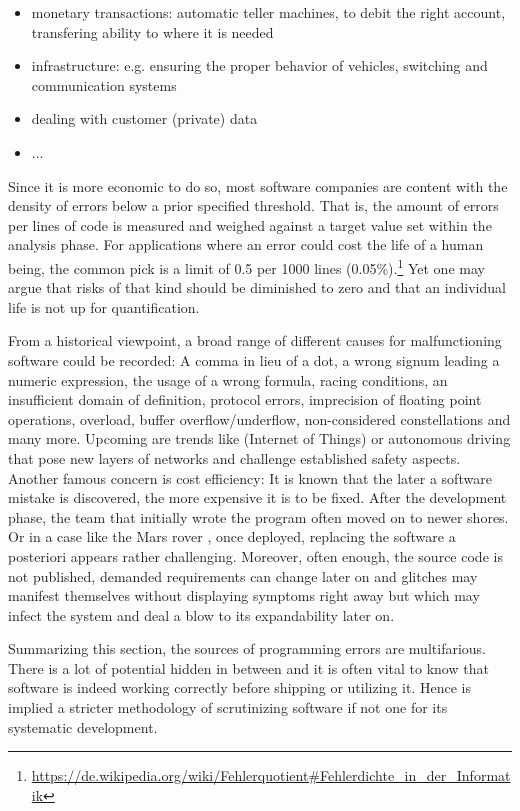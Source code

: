 \begin{itemize}
	\item monetary transactions: automatic teller machines, to debit the right account, transfering ability to where it is needed
	\item infrastructure: e.g. ensuring the proper behavior of vehicles, switching and communication systems
	\item dealing with customer (private) data
	\item ...
\end{itemize}

Since it is more economic to do so, most software companies are content with the density of errors below a prior specified threshold. That is, the amount of errors per lines of code is measured and weighed against a target value set within the analysis phase. For applications where an error could cost the life of a human being, the common pick is a limit of 0.5 per 1000 lines (0.05\%).\footnote{\url{https://de.wikipedia.org/wiki/Fehlerquotient\#Fehlerdichte_in_der_Informatik}} Yet one may argue that risks of that kind should be diminished to zero and that an individual life is not up for quantification.

From a historical viewpoint, a broad range of different causes for malfunctioning software could be recorded: A comma in lieu of a dot, a wrong signum leading a numeric expression, the usage of a wrong formula, racing conditions, an insufficient domain of definition, protocol errors, imprecision of floating point operations, overload, buffer overflow/underflow, non-considered constellations and many more. Upcoming are trends like  (Internet of Things) or autonomous driving that pose new layers of networks and challenge established safety aspects. Another famous concern is cost efficiency: It is known that the later a software mistake is discovered, the more expensive it is to be fixed. After the development phase, the team that initially wrote the program often moved on to newer shores. Or in a case like the Mars rover , once deployed, replacing the software a posteriori appears rather challenging. Moreover, often enough, the source code is not published, demanded requirements can change later on and glitches may manifest themselves without displaying symptoms right away but which may infect the system and deal a blow to its expandability later on.

Summarizing this section, the sources of programming errors are multifarious. There is a lot of potential hidden in between and it is often vital to know that software is indeed working correctly before shipping or utilizing it. Hence is implied a stricter methodology of scrutinizing software if not one for its systematic development.

